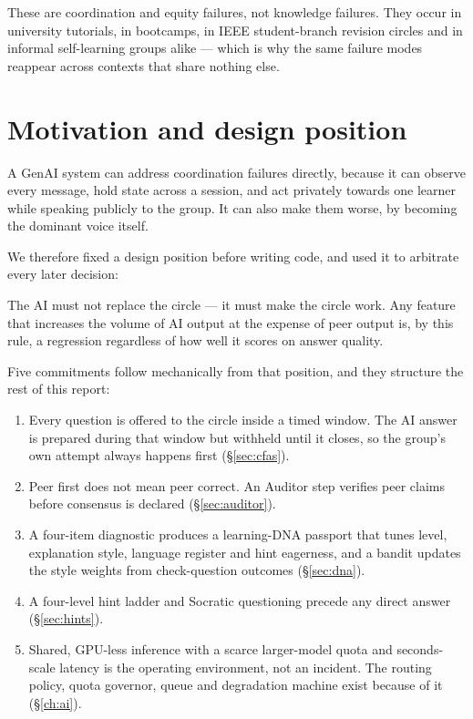 These are coordination and equity failures, not knowledge failures. They occur in
university tutorials, in bootcamps, in IEEE student-branch revision circles and in
informal self-learning groups alike --- which is why the same failure modes reappear
across contexts that share nothing else.

\section{Motivation and design position}

A GenAI system can address coordination failures directly, because it can observe every
message, hold state across a session, and act privately towards one learner while
speaking publicly to the group. It can also make them worse, by becoming the dominant
voice itself.

We therefore fixed a design position before writing code, and used it to arbitrate every
later decision:

\begin{keyfinding}
The AI must not replace the circle --- it must make the circle work. Any feature that
increases the volume of AI output at the expense of peer output is, by this rule,
a regression regardless of how well it scores on answer quality.
\end{keyfinding}

Five commitments follow mechanically from that position, and they structure the rest of
this report:

\begin{enumerate}[leftmargin=1.6em,itemsep=3pt]
  \item {} Every question is offered to the circle inside a
        timed window. The AI answer is prepared during that window but withheld until it
        closes, so the group's own attempt always happens first
        (\S\ref{sec:cfas}).
  \item {} Peer first does not mean peer
        correct. An Auditor step verifies peer claims before consensus is declared
        (\S\ref{sec:auditor}).
  \item {} A four-item diagnostic produces a
        learning-DNA passport that tunes level, explanation style, language register and
        hint eagerness, and a bandit updates the style weights from check-question
        outcomes (\S\ref{sec:dna}).
  \item {} A four-level hint ladder and Socratic
        questioning precede any direct answer (\S\ref{sec:hints}).
  \item {} Shared, GPU-less inference with a
        scarce larger-model quota and seconds-scale latency is the operating
        environment, not an incident. The routing policy, quota governor, queue and
        degradation machine exist because of it (\S\ref{ch:ai}).
\end{enumerate}

